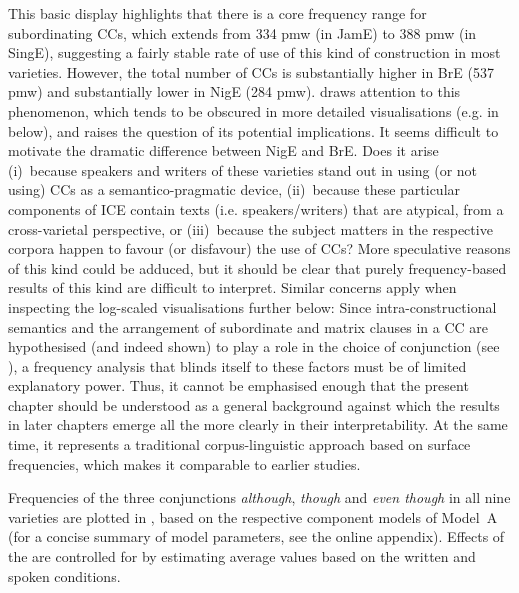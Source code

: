 This basic display highlights that there is a core frequency range for subordinating CCs, which extends from 334 pmw (in JamE) to 388 pmw (in SingE), suggesting a fairly stable rate of use of this kind of construction in most varieties. However, the total number of CCs is substantially higher in BrE (537 pmw) and substantially lower in NigE (284 pmw).  draws attention to this phenomenon, which tends to be obscured in more detailed visualisations (e.g. in  below), and raises the question of its potential implications. It seems difficult to motivate the dramatic difference between NigE and BrE. Does it arise
(i)~because speakers and writers of these varieties stand out in using (or not using) CCs as a semantico-pragmatic device,
(ii)~because these particular components of ICE contain texts (i.e. speakers/writers) that are atypical, from a cross-varietal perspective, or
(iii)~because the subject matters in the respective corpora happen to favour (or disfavour) the use of CCs? More speculative reasons of this kind could be adduced, but it should be clear that purely frequency-based results of this kind are difficult to interpret. Similar concerns apply when inspecting the log-scaled visualisations further below: Since intra-constructional semantics and the arrangement of subordinate and matrix clauses in a CC are hypothesised (and indeed shown) to play a role in the choice of conjunction (see ), a frequency analysis that blinds itself to these factors must be of limited explanatory power. Thus, it cannot be emphasised enough that the present chapter should be understood as a general background against which the results in later chapters emerge all the more clearly in their interpretability. At the same time, it represents a traditional corpus-linguistic approach based on surface frequencies, which makes it comparable to earlier studies.

Frequencies of the three conjunctions \textit{although}, \textit{though} and \textit{even though} in all nine varieties are plotted in , based on the respective component models of Model~A (for a concise summary of model parameters, see the online appendix). Effects of the  are controlled for by estimating average values based on the written and spoken conditions.

